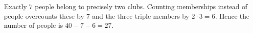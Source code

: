 Exactly $7$ people belong to precisely two clubs. Counting memberships instead of people overcounts these by $7$ and the three triple members by $2\cdot3=6$. Hence the number of people is $40-7-6=\boxed{27}$.
